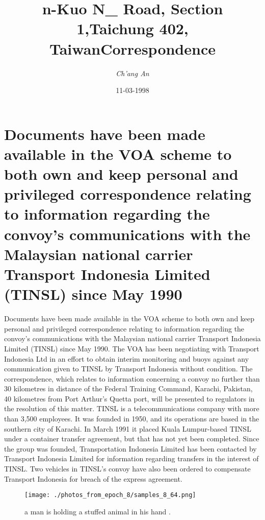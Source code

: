 \documentclass{article}%
\title{n{-}Kuo N\_ Road, Section 1,Taichung 402, TaiwanCorrespondence}%
\author{\textit{Ch'ang An}}%
\date{11-03-1998}%
\begin{document}
%
\normalsize%
\maketitle%
\section{Documents have been made available in the VOA scheme to both own and keep personal and privileged correspondence relating to information regarding the convoy's communications with the Malaysian national carrier Transport Indonesia Limited (TINSL) since May 1990}%
\label{sec:DocumentshavebeenmadeavailableintheVOAschemetobothownandkeeppersonalandprivilegedcorrespondencerelatingtoinformationregardingtheconvoyscommunicationswiththeMalaysiannationalcarrierTransportIndonesiaLimited(TINSL)sinceMay1990}%
Documents have been made available in the VOA scheme to both own and keep personal and privileged correspondence relating to information regarding the convoy's communications with the Malaysian national carrier Transport Indonesia Limited (TINSL) since May 1990.\newline%
The VOA has been negotiating with Transport Indonesia Ltd in an effort to obtain interim monitoring and buoys against any communication given to TINSL by Transport Indonesia without condition.\newline%
The correspondence, which relates to information concerning a convoy no further than 30 kilometres in distance of the Federal Training Command, Karachi, Pakistan, 40 kilometres from Port Arthur's Quetta port, will be presented to regulators in the resolution of this matter.\newline%
TINSL is a telecommunications company with more than 3,500 employees. It was founded in 1950, and its operations are based in the southern city of Karachi. In March 1991 it placed Kuala Lumpur{-}based TINSL under a container transfer agreement, but that has not yet been completed.\newline%
Since the group was founded, Transportation Indonesia Limited has been contacted by Transport Indonesia Limited for information regarding transfers in the interest of TINSL.\newline%
Two vehicles in TINSL's convoy have also been ordered to compensate Transport Indonesia for breach of the express agreement.\newline%

%


\begin{figure}[h!]%
\centering%
\texttt{[image: ./photos\_from\_epoch\_8/samples\_8\_64.png]}%
\caption{a man is holding a stuffed animal in his hand .}%
\end{figure}

%
\end{document}
